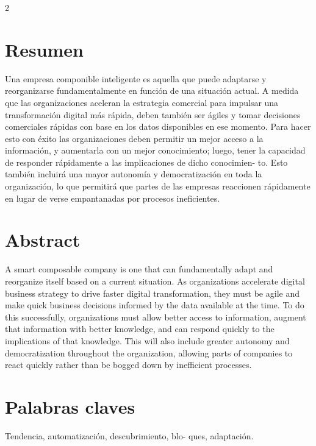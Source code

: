 \documentclass[12pt,spanish,Letterpaper,openany]{book}
\begin{document}
\begin {multicols}{2}

\hypertarget{resumen}{%
\section{Resumen}\label{resumen}}

Una empresa componible inteligente es aquella que puede adaptarse y reorganizarse fundamentalmente en función de una situación actual. A medida que las organizaciones aceleran la estrategia comercial para impulsar una transformación digital más rápida, deben también ser ágiles y tomar decisiones comerciales rápidas con base en los datos disponibles en ese momento. Para hacer esto con éxito las organizaciones deben permitir un mejor acceso a la información, y aumentarla con un mejor conocimiento; luego, tener la capacidad de responder rápidamente a las implicaciones de dicho conocimien-
to. Esto también incluirá una mayor autonomía y democratización en toda la organización, lo que permitirá que partes de las empresas reaccionen rápidamente en lugar de verse empantanadas por procesos ineficientes.

\hypertarget{abstract}{%
\section{Abstract}\label{abstract}}

A smart composable company is one that can fundamentally adapt and reorganize itself based on a current situation. As organizations accelerate digital business strategy to drive faster digital transformation, they must be agile and make quick business decisions informed by the data available at the time. To do this successfully, organizations must allow better access to information, augment that information with better knowledge, and can respond quickly to the implications of that knowledge. This will also include greater autonomy and democratization throughout the organization, allowing parts of companies to react quickly rather than be bogged down by inefficient processes.

\hypertarget{palabras-claves}{%
\section{Palabras claves}\label{palabras-claves}}

Tendencia, automatización, descubrimiento, blo-
ques, adaptación.

\hypertarget{introducciuxf3n}{%
}
\end{multicols}
\end{document}
